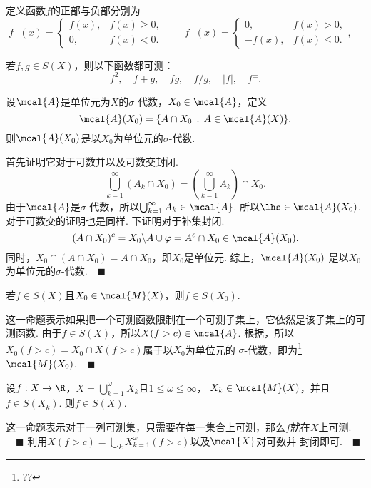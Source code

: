  \begin{defi}
    定义函数$f$的正部与负部分别为
    \[
      f^+(x)=\begin{cases}
        f(x), & f(x)\ge 0,\\
        0,    & f(x) < 0.
      \end{cases}\qquad
      f^-(x)=\begin{cases}
        0,     & f(x) > 0,\\
        -f(x), & f(x) \le 0.
      \end{cases},\quad
    \]
  \end{defi}

  \begin{thm}
    若$f,g\in S(X)$，则以下函数都可测：
    \[
      f^2,\quad f+g,\quad fg,\quad f/g,\quad |f|,\quad f^{\pm}.
    \]
  \end{thm}

  \begin{lemma}
    \label{lemma: sigma-代数、限制}
    设$\mcal{A}$是单位元为$X$的$\sigma$-代数，$X_0\in\mcal{A}$，定义
    \[
      \mcal{A}(X_0) = \{A\cap X_0\,:\,A\in\mcal{A}(X)\}.
    \]
    则$\mcal{A}(X_0)$是以$X_0$为单位元的$\sigma$-代数.
  \end{lemma}
  \proof
    首先证明它对于可数并以及可数交封闭. 
    \[
      \bigcup_{k=1}^\infty(A_k\cap X_0)= 
      \left(\bigcup_{k=1}^\infty A_k \right)\cap X_0.
    \]
    由于$\mcal{A}$是$\sigma$-代数，所以$\bigcup_{k=1}^\infty A_k\in\mcal{A}$.
    所以$\lhs\in\mcal{A}(X_0)$. 对于可数交的证明也是同样. 下证明对于补集封闭.
    \[
      (A\cap X_0)^c = X_0\backslash A \cup \varphi = A^c\cap X_0\in\mcal{A}(X_0).
    \]
    同时，$X_0\cap(A\cap X_0) = A\cap X_0$，即$X_0$是单位元. 综上，$\mcal{A}(X_0)$
    是以$X_0$为单位元的$\sigma$-代数.$\quad\blacksquare$

  \begin{pos}
    若$f\in S(X)$且$X_0\in\mcal{M}(X)$，则$f\in S(X_0)$.
  \end{pos}
  \remark
    这一命题表示如果把一个可测函数限制在一个可测子集上，它依然是该子集上的可测函数.
  \proof
    由于$f\in S(X)$，所以$X(f>c)\in\mcal{A}$. 根据，所以$X_0(f>c) = X_0\cap X(f>c)$属于以$X_0$为单位元的
    $\sigma$-代数，即为\footnote{??}$\mcal{M}(X_0)$.$\quad\blacksquare$
  
  \begin{thm}
    设$f:X\to\R$，$X=\bigcup_{k=1}^\omega X_k$且$1\le\omega\le\infty$，
    $X_k\in\mcal{M}(X)$，并且$f\in S(X_k)$. 则$f\in S(X)$.
  \end{thm}
  \remark
    这一命题表示对于一列可测集，只需要在每一集合上可测，那么$f$就在$X$上可测.
    $\quad\blacksquare$
  \proof
    利用$X(f>c)=\bigcup_k X_{k=1}^\omega(f>c)$以及$\mcal{X}$对可数并
    封闭即可.$\quad\blacksquare$

